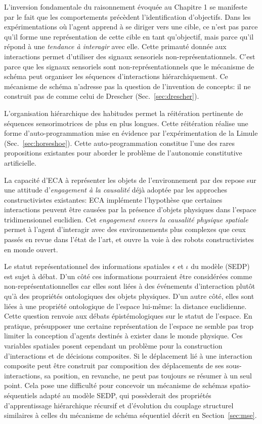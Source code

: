 L'inversion fondamentale du raisonnement évoquée au Chapitre 1 se manifeste par le fait que les comportements précèdent l'identification d'objectifs. 
Dans les expérimentations où l'agent apprend à se diriger vers une cible, ce n'est pas parce qu'il forme une représentation de cette cible en tant qu'objectif, mais parce qu'il répond à une \emph{tendance à interagir} avec elle.
Cette primauté donnée aux interactions permet d'utiliser des signaux sensoriels non-représentationnels.
C'est parce que les signaux sensoriels sont non-représentationnels que le mécanisme de schéma peut organiser les séquences d'interactions hiérarchiquement.
Ce mécanisme de schéma n'adresse pas la question de l'invention de concepts: il ne construit pas de  comme celui de Drescher (Sec.~\ref{sec:drescher}). 


L'organisation hiérarchique des habitudes permet la réitération pertinente de séquences sensorimotrices de plus en plus longues. 
Cette réitération réalise une forme d'auto-programmation mise en évidence par l'expérimentation de la Limule (Sec.~\ref{sec:horseshoe}).
Cette auto-programmation constitue l'une des rares propositions existantes pour aborder le problème de l'autonomie constitutive artificielle.



La capacité d'ECA à représenter les objets de l'environnement par des  repose sur une attitude d'\emph{engagement à la causalité} déjà adoptée par les approches constructivistes existantes:
ECA implémente l'hypothèse que certaines interactions peuvent être causées par la présence d'objets physiques dans l'espace tridimensionnel euclidien.
Cet \emph{engagement envers la causalité physique spatiale} permet à l'agent d'interagir avec des environnements plus complexes que ceux passés en revue dans l'état de l'art, et ouvre la voie à des robots constructivistes en monde ouvert.

Le statut représentationnel des informations spatiales $\epsilon$ et $\iota$ du modèle  (SEDP) est sujet à débat.
D'un côté ces informations pourraient être considérées comme non-représentationnelles car elles sont liées à des événements d'interaction plutôt qu'à des propriétés ontologiques des objets physiques.  
D'un autre côté, elles sont liées à une propriété ontologique de l'espace lui-même: la distance euclidienne.
Cette question renvoie aux débats épistémologiques sur le statut de l'espace.
En pratique, présupposer une certaine représentation de l'espace ne semble pas trop limiter la conception d'agents destinés à exister dans le monde physique.
Ces variables spatiales posent cependant un problème pour la construction d'interactions et de décisions composites. 
Si le déplacement lié à une interaction composite peut être construit par composition des déplacements de ses sous-interactions, sa position, en revanche, ne peut pas toujours se résumer à un seul point.
Cela pose une difficulté pour concevoir un mécanisme de schémas spatio-séquentiels adapté au modèle SEDP, qui possèderait des propriétés d'apprentissage hiérarchique récursif et d'évolution du couplage structurel similaires à celles du mécanisme de schéma séquentiel décrit en Section~\ref{sec:mse}. 


